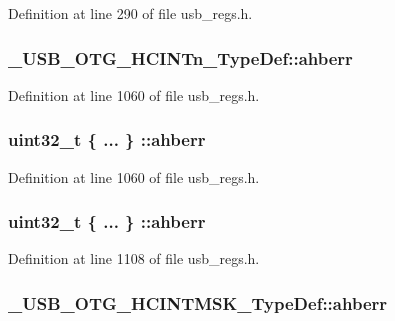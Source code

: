 Definition at line 290 of file usb\-\_\-regs.\-h.

\hypertarget{group___u_s_b___o_t_g___d_r_i_v_e_r_ga05ee851a5de549e1e051f35f3e298971}{
\subsubsection[{ahberr}]{ \-\_\-\-U\-S\-B\-\_\-\-O\-T\-G\-\_\-\-H\-C\-I\-N\-Tn\-\_\-\-Type\-Def\-::ahberr}}\label{group___u_s_b___o_t_g___d_r_i_v_e_r_ga05ee851a5de549e1e051f35f3e298971}


Definition at line 1060 of file usb\-\_\-regs.\-h.

\hypertarget{group___u_s_b___o_t_g___d_r_i_v_e_r_gae42a016e7bb50aa815929aea8a950cb9}{
\subsubsection[{ahberr}]{\setlength{\rightskip}{0pt plus 5cm}uint32\-\_\-t \{ ... \} \-::ahberr}}\label{group___u_s_b___o_t_g___d_r_i_v_e_r_gae42a016e7bb50aa815929aea8a950cb9}


Definition at line 1060 of file usb\-\_\-regs.\-h.

\hypertarget{group___u_s_b___o_t_g___d_r_i_v_e_r_ga81723a39a32ae1b71f3fbc8c2487a302}{
\subsubsection[{ahberr}]{\setlength{\rightskip}{0pt plus 5cm}uint32\-\_\-t \{ ... \} \-::ahberr}}\label{group___u_s_b___o_t_g___d_r_i_v_e_r_ga81723a39a32ae1b71f3fbc8c2487a302}


Definition at line 1108 of file usb\-\_\-regs.\-h.

\hypertarget{group___u_s_b___o_t_g___d_r_i_v_e_r_gada60e63ae630cebc4f260a670bc2a79f}{
\subsubsection[{ahberr}]{ \-\_\-\-U\-S\-B\-\_\-\-O\-T\-G\-\_\-\-H\-C\-I\-N\-T\-M\-S\-K\-\_\-\-Type\-Def\-::ahberr}}\label{group___u_s_b___o_t_g___d_r_i_v_e_r_gada60e63ae630cebc4f260a670bc2a79f}


